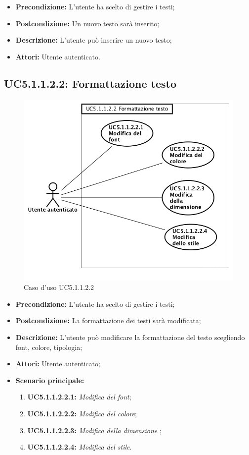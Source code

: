 \begin{itemize}
	\item \textbf{Precondizione:} L'utente ha scelto di gestire i testi;
	\item \textbf{Postcondizione:} Un nuovo testo sarà inserito;
	\item \textbf{Descrizione:} L'utente può inserire un nuovo testo;
	\item \textbf{Attori:} Utente autenticato.
\end{itemize}
\newpage
\subsection{ UC5.1.1.2.2: Formattazione testo}

\begin{figure}[h]
	\begin{center}
	\includegraphics[scale=0.4]{diagram/UC5-1-1-2-2.png}
	\caption{Caso d'uso UC5.1.1.2.2}
	\end{center}
\end{figure}
\begin{itemize}
	\item \textbf{Precondizione:} L'utente ha scelto di gestire i testi;
	\item \textbf{Postcondizione:} La formattazione dei testi sarà modificata;
	\item \textbf{Descrizione:} L'utente può modificare la formattazione del testo scegliendo font, colore, tipologia;
	\item \textbf{Attori:} Utente autenticato;
	\item \textbf{Scenario principale:}
	\begin{enumerate}
		\item \textbf{ UC5.1.1.2.2.1:} \textit{ Modifica del font};
		\item \textbf{ UC5.1.1.2.2.2:} \textit{ Modifica del colore};
		\item \textbf{ UC5.1.1.2.2.3:} \textit{ Modifica della dimensione };
		\item \textbf{ UC5.1.1.2.2.4:} \textit{ Modifica del stile}.
	\end{enumerate}
\end{itemize}
